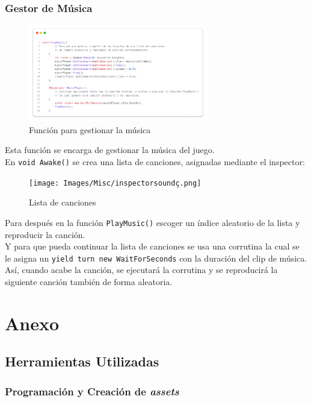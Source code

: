 \documentclass[11pt]{article}
\begin{document}
            \newpage
            \subsubsection{Gestor de Música}
            \begin{figure}[H]
                \centering
                \includegraphics[width=0.7\textwidth]{Images/Misc/sound.png}
                \caption{Función para gestionar la música}
                \label{fig:musica}
            \end{figure}

            Esta función se encarga de gestionar la música del juego.\\
            En \texttt{void Awake()} se crea una lista de canciones, asignadas mediante el inspector:
            \begin{figure}[H]
                \centering
                \texttt{[image: Images/Misc/inspectorsoundç.png]}
                \caption{Lista de canciones}
            \end{figure}

            Para después en la función \texttt{PlayMusic()} escoger un índice aleatorio de la lista y reproducir la canción.\\
            Y para que pueda continuar la lista de canciones se usa una corrutina la cual se le asigna un \texttt{yield turn new WaitForSeconds} con la duración del clip de música. Así, cuando acabe la canción, se ejecutará la corrutina y se reproducirá la siguiente canción también de forma aleatoria.\\


\newpage
\section{Anexo}
    \subsection{Herramientas Utilizadas}
        \subsubsection{Programación y Creación de \textit{assets}}
\end{document}
